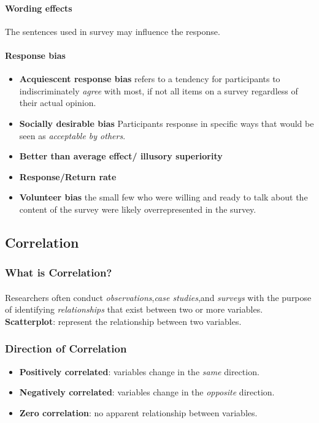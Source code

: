 \documentclass{article}
\begin{document}
 	\paragraph{Wording effects} The sentences used in survey may influence the response.
 	\paragraph{Response bias}
 	\begin{itemize}
 		\item \textbf{Acquiescent response bias} refers to a tendency for participants to indiscriminately \emph{agree} with most, if not all items on a survey regardless of their actual opinion.
 		\item \textbf{Socially desirable bias} Participants response in specific ways that would be seen as \emph{acceptable by others}.
 		\item \textbf{Better than average effect/ illusory superiority}
 		\item \textbf{Response/Return rate}
 		\item \textbf{Volunteer bias} the small few who were willing and ready to talk about the content of the survey were likely overrepresented in the survey.
 	\end{itemize}
 	\subsection{Correlation}
 	\subsubsection{What is Correlation?}
 	\paragraph{}Researchers often conduct \emph{observations},\emph{case studies},and \emph{surveys} with the purpose of identifying \emph{relationships} that exist between two or more variables.
 	\newline \textbf{Scatterplot}: represent the relationship between two variables.
 	\subsubsection{Direction of Correlation}
 	\begin{itemize}
 		\item \textbf{Positively correlated}: variables change in the \emph{same} direction.
 		\item \textbf{Negatively correlated}: variables change in the \emph{opposite} direction.
 		\item \textbf{Zero correlation}: no apparent relationship between variables.
 	\end{itemize}
\end{document}
